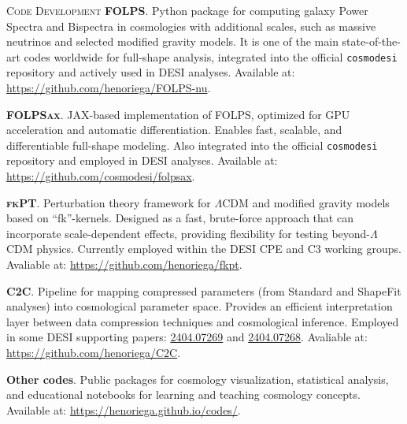 \begin{rubric}{\faCode \textsc{Code Development}}
\entry*[]
	\textbf{FOLPS}. Python package for computing galaxy Power Spectra and Bispectra in cosmologies with additional scales, such as massive neutrinos and selected modified gravity models. It is one of the main state-of-the-art codes worldwide for full-shape analysis, integrated into the official \texttt{cosmodesi} repository and actively used in DESI analyses. Available at: \url{https://github.com/henoriega/FOLPS-nu}.
    
\entry*[]
	  \textbf{\textsc{FOLPSax}}. JAX-based implementation of FOLPS, optimized for GPU acceleration and automatic differentiation. Enables fast, scalable, and differentiable full-shape modeling. Also integrated into the official \texttt{cosmodesi} repository and employed in DESI analyses. Available at: \url{https://github.com/cosmodesi/folpsax}.

\entry*[]
	  \textbf{\textsc{fkPT}}. Perturbation theory framework for $\Lambda$CDM and modified gravity models based on “fk”-kernels. Designed as a fast, brute-force approach that can incorporate scale-dependent effects, providing flexibility for testing beyond-$\Lambda$CDM physics. Currently employed within the DESI CPE and C3 working groups. Avaliable at: \url{https://github.com/henoriega/fkpt}.


\entry*[]
    \textbf{C2C}. Pipeline for mapping compressed parameters (from Standard and ShapeFit analyses) into cosmological parameter space. Provides an efficient interpretation layer between data compression techniques and cosmological inference. Employed in some DESI supporting papers: \href{https://arxiv.org/abs/2404.07269}{2404.07269} and \href{https://arxiv.org/abs/2404.07268}{2404.07268}. Avaliable at: \url{https://github.com/henoriega/C2C}.

\entry*[]
	  \textbf{Other codes}. Public packages for cosmology visualization, statistical analysis, and educational notebooks for learning and teaching cosmology concepts. Available at: \url{https://henoriega.github.io/codes/}.
\end{rubric}